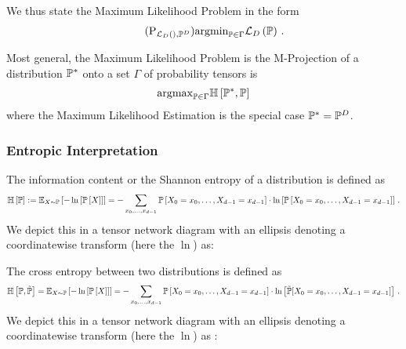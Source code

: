 We thus state the Maximum Likelihood Problem in the form
\begin{align}\tag{$\mathrm{P}_{\lossof{}, \empdistribution}$}\label{prob:parameterMaxLikelihood}
	\argmin_{\probtensor\in\Gamma} \lossof{\probtensor} \, . %
\end{align}



Most general, the Maximum Likelihood Problem is the M-Projection of a distribution $\mathbb{P}^*$ onto a set $\Gamma$ of probability tensors is
\begin{align}
	\mathrm{argmax}_{\mathbb{P}\in\Gamma}  \mathbb{H}\left[\mathbb{P}^*,\mathbb{P}\right] 
\end{align}
where the Maximum Likelihood Estimation is the special case $\mathbb{P}^*=\mathbb{P}^{D}$.




\subsubsection{Entropic Interpretation}

\begin{definition}
	The information content or the Shannon entropy of a distribution is defined as
		\[ \mathbb{H}\left[\mathbb{P}\right] := \mathbb{E}_{X\sim\mathbb{P}}\left[-\ln \left[ \mathbb{P}\left[X\right] \right]\right] = - \sum_{x_{0},\ldots,x_{d-1}} \mathbb{P}\left[X_{0}=x_{0},\ldots,X_{d-1}=x_{d-1}\right] \cdot \ln \left[ \mathbb{P}\left[X_{0}=x_{0},\ldots,X_{d-1}=x_{d-1}\right] \right] \, . \]
	We depict this in a tensor network diagram with an ellipsis denoting a coordinatewise transform (here the $\ln$) as:
	\begin{center}
		
	\end{center}
\end{definition}


\begin{definition}\label{def:crossEntropy}
	The cross entropy between two distributions is defined as 
		\[ \mathbb{H}\left[\mathbb{P},\tilde{\mathbb{P}}\right] 
		=  \mathbb{E}_{X\sim\mathbb{P}}\left[-\ln \left[ \mathbb{P}\left[X\right] \right]\right] 
		= - \sum_{x_{0},\ldots,x_{d-1}}  \mathbb{P}\left[X_{0}=x_{0},\ldots,X_{d-1}=x_{d-1}\right] \cdot \ln \left[ \tilde{\mathbb{P}}[X_{0}=x_{0},\ldots,X_{d-1}=x_{d-1}] \right]  \, . \]
	We depict this in a tensor network diagram with an ellipsis denoting a coordinatewise transform (here the $\ln$) as :
	\begin{center}
		
	\end{center}
\end{definition}


